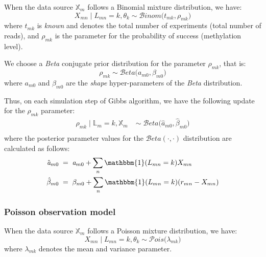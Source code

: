 When the data source $\mathbb{X}_{m}$ follows a Binomial mixture distribution, we have:
\begin{equation}
	X_{mn} \mid L_{mn} = k, \theta_{k} \sim \mathcal{B}inom\big(t_{mk}, \rho_{mk}\big)
\end{equation}
where $t_{mk}$ is \emph{known} and denotes the total number of experiments (\ie total number of reads), and $\rho_{mk}$ is the parameter for the probability of success (\ie methylation level).

We choose a \emph{Beta} conjugate prior distribution for the parameter $\rho_{mk}$, that is:
\begin{equation}
	\rho_{mk} \sim \mathcal{B}eta\big(\mathit{a}_{m0}, \beta_{m0}\big)
\end{equation}
where $\mathit{a}_{m0}$ and $\beta_{m0}$ are the \emph{shape} hyper-parameters of the \emph{Beta} distribution.

Thus, on each simulation step of Gibbs algorithm, we have the following update for the $\rho_{mk}$ parameter:
\begin{equation}
  \begin{aligned}
  	\rho_{mk} \mid \mathbb{L}_{m}=k, \mathbb{X}_{m} \;& \sim \;\mathcal{B}eta\big(\hat{\mathit{a}}_{m0}, \hat{\beta}_{m0}\big) \\
  \end{aligned}
\end{equation}
where the posterior parameter values for the $\mathcal{B}eta(\cdot,\cdot)$ distribution are calculated as follows:
\begin{equation}
  \begin{aligned}
  	\hat{\mathit{a}}_{m0} \; &= \; \mathit{a}_{m0} + \sum_{n}\mathbbm{1}(L_{mn}=k)X_{mn} \\
  	\hat{\beta}_{m0} \; &= \; \beta_{m0} +  \sum_{n}\mathbbm{1}(L_{mn}=k)(r_{mn} - X_{mn})
  \end{aligned}
\end{equation}

\subsubsection*{Poisson observation model}
When the data source $\mathbb{X}_{m}$ follows a Poisson mixture distribution, we have:
\begin{equation}
	X_{mn} \mid L_{mn} = k, \theta_{k} \sim \mathcal{P}ois\big(\lambda_{mk}\big)
\end{equation}
where $\lambda_{mk}$ denotes the mean and variance parameter.

